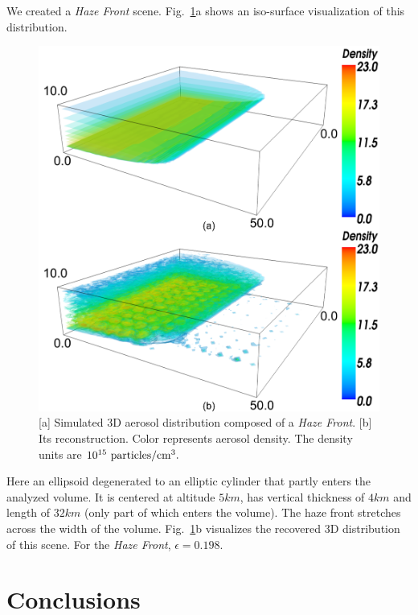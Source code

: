 \documentclass[10pt,twocolumn,letterpaper]{article}
\newcommand{\yoavcomment}[1]{}
\renewcommand{\yoavcomment}[1]{#1} %
\begin{document}
We created a {\em Haze Front} scene. Fig.~\ref{fig:simulation2}a shows
an iso-surface visualization of this distribution.
\begin{figure}
  \centering
  \yoavcomment{\includegraphics[width=\columnwidth]{images/simulation2}}
  \caption{\small [a] Simulated 3D aerosol distribution composed of a
    {\em Haze Front}. [b] Its reconstruction. Color represents aerosol
    density. The density units are $10^{15}~{\rm particles}/{\rm
      cm}^3.$}
  \label{fig:simulation2}
\end{figure}
Here an ellipsoid degenerated to an elliptic cylinder that partly
enters the analyzed volume. It is centered at altitude $5km$, has
vertical thickness of $4km$ and length of $32km$ (only part of which
enters the volume). The haze front stretches across the width of the
volume.  Fig.~\ref{fig:simulation2}b visualizes the recovered 3D
distribution of this scene. For the {\em Haze Front},
$\epsilon=0.198$.


\section{Conclusions}
\label{sec:conclusions}
\end{document}
